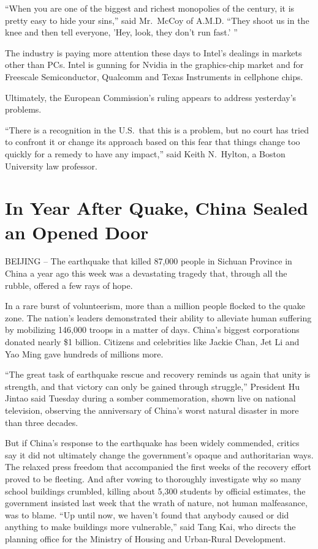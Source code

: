 \documentclass[12pt,a4paper,onecolumn]{article}
\begin{document}
``When you are one of the biggest and richest monopolies of the century, it is pretty easy to hide
your sins,'' said Mr.~McCoy of A.M.D. ``They shoot us in the knee and then tell everyone, 'Hey,
look, they don't run fast.' ''

The industry is paying more attention these days to Intel's dealings in markets other than PCs.
Intel is gunning for Nvidia in the graphics-chip market and for Freescale Semiconductor, Qualcomm
and Texas Instruments in cellphone chips.

Ultimately, the European Commission's ruling appears to address yesterday's problems.

``There is a recognition in the U.S.~that this is a problem, but no court has tried to confront it
or change its approach based on this fear that things change too quickly for a remedy to have any
impact,'' said Keith N.~Hylton, a Boston University law professor.

\section{In Year After Quake, China Sealed an Opened Door}

BEIJING -- The earthquake that killed 87,000 people in Sichuan Province in China a year ago this
week was a devastating tragedy that, through all the rubble, offered a few rays of hope.

In a rare burst of volunteerism, more than a million people flocked to the quake zone. The nation's
leaders demonstrated their ability to alleviate human suffering by mobilizing 146,000 troops in a
matter of days. China's biggest corporations donated nearly \$1 billion. Citizens and celebrities
like Jackie Chan, Jet Li and Yao Ming gave hundreds of millions more.

``The great task of earthquake rescue and recovery reminds us again that unity is strength, and that
victory can only be gained through struggle,'' President Hu Jintao said Tuesday during a somber
commemoration, shown live on national television, observing the anniversary of China's worst natural
disaster in more than three decades.

But if China's response to the earthquake has been widely commended, critics say it did not
ultimately change the government's opaque and authoritarian ways. The relaxed press freedom that
accompanied the first weeks of the recovery effort proved to be fleeting. And after vowing to
thoroughly investigate why so many school buildings crumbled, killing about 5,300 students by
official estimates, the government insisted last week that the wrath of nature, not human
malfeasance, was to blame. ``Up until now, we haven't found that anybody caused or did anything to
make buildings more vulnerable,'' said Tang Kai, who directs the planning office for the Ministry of
Housing and Urban-Rural Development.
\end{document}
